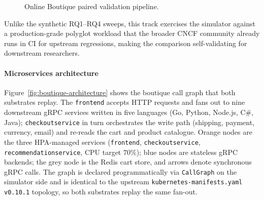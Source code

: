 \documentclass[ASNA,twocolumn]{USG}
\begin{document}
\begin{figure}[!t]
        \caption{Online Boutique paired validation pipeline.}
        \label{fig:boutique-topology}
    \end{figure}

    Unlike the synthetic RQ1--RQ4 sweeps, this track exercises the
    simulator against a production-grade polyglot workload that the
    broader CNCF community already runs in CI for upstream regressions,
    making the comparison self-validating for downstream researchers.

    \paragraph{Microservices architecture}
    Figure~\ref{fig:boutique-architecture} shows the boutique call graph
    that both substrates replay. The \texttt{frontend} accepts HTTP
    requests and fans out to nine downstream gRPC services written in five
    languages (Go, Python, Node.js, C\#, Java); \texttt{checkoutservice} in
    turn orchestrates the write path (shipping, payment, currency, email)
    and re-reads the cart and product catalogue. Orange nodes are the
    three HPA-managed services (\texttt{frontend}, \texttt{checkoutservice},
    \texttt{recommendationservice}, CPU target $70\%$); blue nodes are
    stateless gRPC backends; the grey node is the Redis cart store, and
    arrows denote synchronous gRPC calls. The graph is declared
    programmatically via \texttt{CallGraph} on the simulator side and is
    identical to the upstream \texttt{kubernetes-manifests.yaml v0.10.1}
    topology, so both substrates replay the same fan-out.
\end{document}
